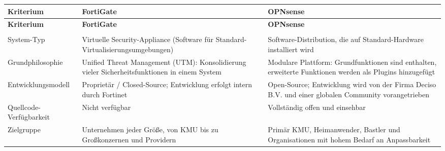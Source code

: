 \begin{longtable}{>{\RaggedRight}p{} >{\RaggedRight}p{} >{\RaggedRight}p{}}
	\toprule
	\textbf{Kriterium} & \textbf{FortiGate} & \textbf{OPNsense} \\
	\midrule
	\endfirsthead
	
	\toprule
	\textbf{Kriterium} & \textbf{FortiGate} & \textbf{OPNsense} \\
	\midrule
	\endhead
	
	\bottomrule
	\endfoot
	
	\bottomrule
	\endlastfoot
	
	
	\multicolumn{3}{l}{\textbf{I. Grundlegende Architektur \& Philosophie}} \\
	\midrule
	System-Typ & Virtuelle Security-Appliance (Software für Standard-Virtualisierungsumgebungen) & Software-Distribution, die auf Standard-Hardware installiert wird \\
	\addlinespace
	Grundphilosophie & Unified Threat Management (UTM): Konsolidierung vieler Sicherheitsfunktionen in einem System & Modulare Plattform: Grundfunktionen sind enthalten, erweiterte Funktionen werden als Plugins hinzugefügt \\
	\addlinespace
	Entwicklungsmodell & Proprietär / Closed-Source; Entwicklung erfolgt intern durch Fortinet & Open-Source; Entwicklung wird von der Firma Deciso B.V. und einer globalen Community vorangetrieben \\
	\addlinespace
	Quellcode-Verfügbarkeit & Nicht verfügbar & Vollständig offen und einsehbar \\
	\addlinespace
	Zielgruppe & Unternehmen jeder Größe, von KMU bis zu Großkonzernen und Providern & Primär KMU, Heimanwender, Bastler und Organisationen mit hohem Bedarf an Anpassbarkeit \\
	\midrule
	

\end{longtable}
